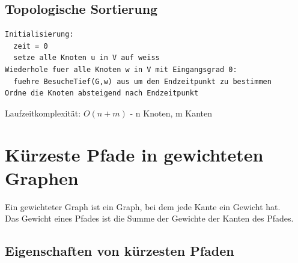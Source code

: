 \documentclass{scrreprt}
\begin{document}
\subsection{Topologische Sortierung}
\begin{lstlisting}
Initialisierung:
  zeit = 0
  setze alle Knoten u in V auf weiss
Wiederhole fuer alle Knoten w in V mit Eingangsgrad 0:
  fuehre BesucheTief(G,w) aus um den Endzeitpunkt zu bestimmen
Ordne die Knoten absteigend nach Endzeitpunkt
\end{lstlisting}
Laufzeitkomplexität: $O(n+m)$ - n Knoten, m Kanten
\section{Kürzeste Pfade in gewichteten Graphen}
Ein gewichteter Graph ist ein Graph, bei dem jede Kante ein Gewicht hat.
\\Das Gewicht eines Pfades ist die Summe der Gewichte der Kanten des Pfades.
\subsection{Eigenschaften von kürzesten Pfaden}
\end{document}
